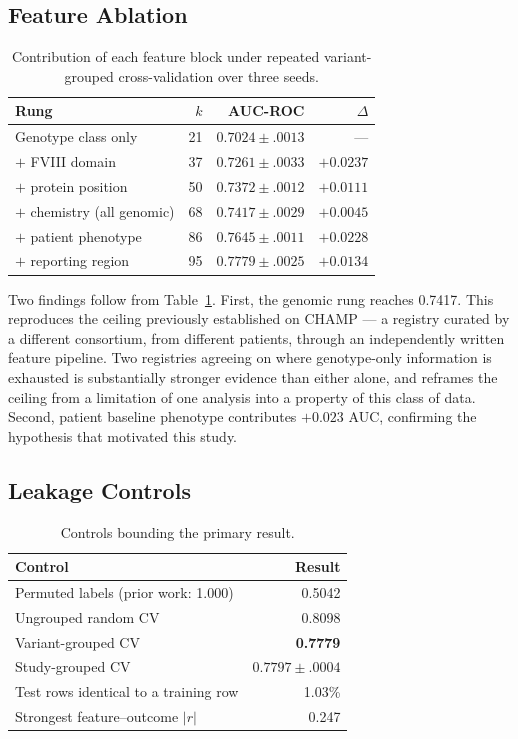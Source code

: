 \documentclass[conference]{IEEEtran}
\begin{document}
\subsection{Feature Ablation}

\begin{table}[!t]
\caption{Contribution of each feature block under repeated variant-grouped
cross-validation over three seeds.}
\label{tab:ablation}
\centering
\footnotesize
\begin{tabular}{lrrr}
\toprule
Rung & $k$ & AUC-ROC & $\Delta$ \\
\midrule
Genotype class only        & 21 & $0.7024 \pm .0013$ & --- \\
$+$ FVIII domain           & 37 & $0.7261 \pm .0033$ & $+0.0237$ \\
$+$ protein position       & 50 & $0.7372 \pm .0012$ & $+0.0111$ \\
$+$ chemistry (all genomic)& 68 & $\mathbf{0.7417 \pm .0029}$ & $+0.0045$ \\
$+$ patient phenotype      & 86 & $\mathbf{0.7645 \pm .0011}$ & $+0.0228$ \\
$+$ reporting region       & 95 & $0.7779 \pm .0025$ & $+0.0134$ \\
\bottomrule
\end{tabular}
\end{table}

Two findings follow from Table~\ref{tab:ablation}. First, the genomic rung
reaches 0.7417. This reproduces the ceiling previously established on CHAMP ---
a registry curated by a different consortium, from different patients, through
an independently written feature pipeline. Two registries agreeing on where
genotype-only information is exhausted is substantially stronger evidence than
either alone, and reframes the ceiling from a limitation of one analysis into a
property of this class of data. Second, patient baseline phenotype contributes
$+0.023$ AUC, confirming the hypothesis that motivated this study.

\subsection{Leakage Controls}

\begin{table}[!t]
\caption{Controls bounding the primary result.}
\label{tab:controls}
\centering
\footnotesize
\begin{tabular}{lr}
\toprule
Control & Result \\
\midrule
Permuted labels (prior work: 1.000)       & 0.5042 \\
Ungrouped random CV                       & 0.8098 \\
Variant-grouped CV                        & \textbf{0.7779} \\
Study-grouped CV                          & $0.7797 \pm .0004$ \\
Test rows identical to a training row     & 1.03\% \\
Strongest feature--outcome $|r|$          & 0.247 \\
\bottomrule
\end{tabular}
\end{table}
\end{document}

